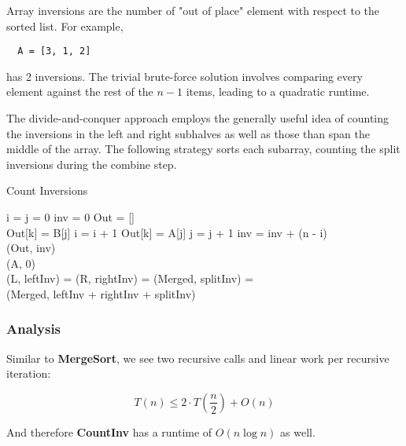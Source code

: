 \documentclass{standalone}
\begin{document}
Array inversions are the number of "out of place" element with respect to the sorted list. For example,

\begin{verbatim}
  A = [3, 1, 2]
\end{verbatim}

has 2 inversions. The trivial brute-force solution involves comparing every element against the rest of the $n-1$ items, leading to a quadratic runtime.

The divide-and-conquer approach employs the generally useful idea of counting the inversions in the left and right subhalves as well as those than span the middle of the array. The following strategy sorts each subarray, counting the split inversions during the combine step.

\begin{algorithm}
\caption{Count Inversions}
  \begin{algorithmic}
      \State i = j = 0
      \State inv = 0
      \State Out = [] \\
          \State Out[k] = B[j]
          \State i = i + 1
        \Else
          \State Out[k] = A[j]
          \State j = j + 1
          \State inv = inv + (n - i) \\
        \EndIf
      \EndFor
      \Return (Out, inv) \\
    \EndProcedure
        \Return (A, 0) \\
      \EndIf
      \State (L, leftInv) = 
      \State (R, rightInv) = 
      \State (Merged, splitInv) =  \\
      \Return (Merged, leftInv + rightInv + splitInv)
    \EndProcedure
  \end{algorithmic}
\end{algorithm}

\subsubsection{Analysis}

Similar to \textbf{MergeSort}, we see two recursive calls and linear work per recursive iteration:

\[
  T(n) \leqslant 2 \cdot T(\frac n 2) + O(n)
\]

And therefore \textbf{CountInv} has a runtime of $O(n \log n)$ as well.
\end{document}
